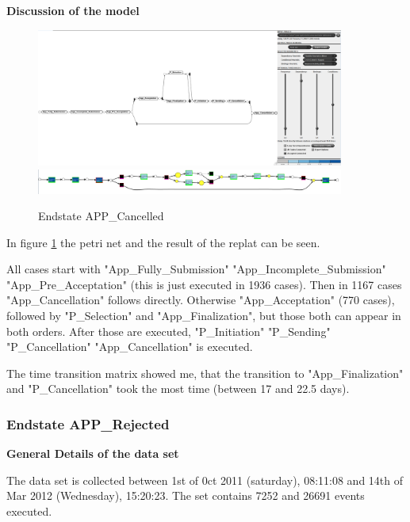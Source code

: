 \textbf{Discussion of the model}

\begin{figure}[!htbp]
\centering
\includegraphics[width=0.9\textwidth]{APP_CancDFG0-1.PNG}
\includegraphics[width=0.9\textwidth]{CancReplay.PNG}
\caption{Endstate APP\_Cancelled}
\label{fig:CancModel}
\end{figure}

In figure \ref{fig:CancModel} the petri net and the result of the replat can be seen.

All cases start with "App\_Fully\_Submission" \textrightarrow "App\_Incomplete\_Submission" \textrightarrow "App\_Pre\_Acceptation" (this is just executed in 1936 cases). Then in 1167 cases "App\_Cancellation" follows directly. Otherwise "App\_Acceptation" (770 cases), followed by "P\_Selection" and "App\_Finalization", but those both can appear in both orders. After those are executed, "P\_Initiation" \textrightarrow "P\_Sending" \textrightarrow "P\_Cancellation" \textrightarrow"App\_Cancellation" is executed.

The time transition matrix showed me, that the transition to "App\_Finalization" and "P\_Cancellation" took the most time (between 17 and 22.5 days).


\subsubsection{Endstate APP\_Rejected}

\textbf{General Details of the data set}

The data set is collected between 1st of 0ct 2011 (saturday), 08:11:08 and 14th of Mar 2012 (Wednesday), 15:20:23. The set contains 7252 and 26691 events executed. 

